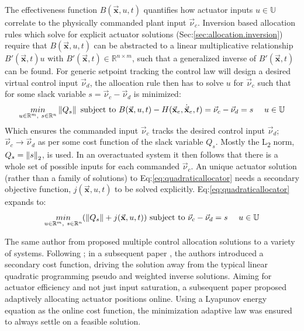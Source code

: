 \par
The effectiveness function $B(\vec{\mathbf{x}},u,t)$ quantifies how actuator inputs $u\in\mathbb{U}$ correlate to the physically commanded plant input $\vec{\nu}_c$. Inversion based allocation rules which solve for explicit actuator solutions (Sec:\ref{sec:allocation.inversion}) require that $B(\vec{\mathbf{x}},u,t)$ can be abstracted to a linear multiplicative relationship $B'(\vec{\mathbf{x}},t)u$ with $B'(\vec{\mathbf{x}},t)\in\mathbb{R}^{n\times m}$, such that a generalized inverse of $B'(\vec{\mathbf{x}},t)$ can be found. For generic setpoint tracking the control law will design a desired virtual control input $\vec{\nu}_d$, the allocation rule then has to solve $u$ for $\vec{\nu}_c$ such that for some slack variable $s=\vec{\nu}_c-\vec{\nu}_d$ is minimized:
\begin{equation}\label{eq:quadraticallocator}
\underset{u \in \mathbb{R}^m,~s \in \mathbb{R}^n}{min}\left\lVert Q_s\right\rVert ~\text{subject to} ~B(\vec{\mathbf{x}},u,t) - H(\vec{\mathbf{x}}_e,\dot{\vec{\mathbf{x}}}_e,t)=\vec{\nu}_c-\vec{\nu}_d=s~~~~u \in \mathbb{U}
\end{equation}
Which ensures the commanded input $\vec{\nu}_c$ tracks the desired control input $\vec{\nu}_d$;~$\vec{\nu}_c\rightarrow\vec{\nu}_d$ as per some cost function of the slack variable $Q_s$. Mostly the L\textsubscript{2} norm, $Q_s=\left\lVert s\right\rVert_2$, is used. In an overactuated system it then follows that there is a whole set of possible inputs for each commanded $\vec{\nu}_c$. An unique actuator solution (rather than a family of solutions) to Eq:\ref{eq:quadraticallocator} needs a secondary objective function, $j(\vec{\mathbf{x}},u,t)$ to be solved explicitly. Eq:\ref{eq:quadraticallocator} expands to:
\begin{equation} \label{eq:quadraticallocatorcost}
\underset{u \in \mathbb{R}^m,~s \in \mathbb{R}^n}{min}(\left\lVert Q_s\right\rVert+j(\vec{\mathbf{x}},u,t)) ~\text{subject to} ~\vec{\nu}_c - \vec{\nu}_d=s~~~~u \in \mathbb{U}
\end{equation}
\par
The same author from \cite{allocation,efficientallocation,adaptiveallocation} proposed multiple control allocation solutions to a variety of systems. Following \cite{allocation}; in a subsequent paper \cite{efficientallocation}, the authors introduced a secondary cost function, driving the solution away from the typical linear quadratic programming pseudo and weighted inverse solutions.  Aiming for actuator efficiency and not just input saturation, a subsequent paper \cite{adaptiveallocation} proposed adaptively allocating actuator positions online. Using a Lyapunov energy equation as the online cost function, the minimization adaptive law was ensured to always settle on a feasible solution.

